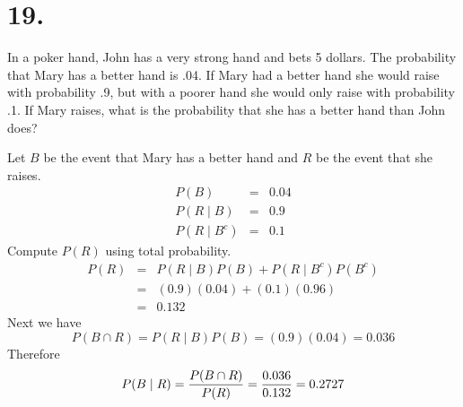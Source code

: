 \section*{19.}
In a poker hand, John has a very strong hand and bets 5 dollars. The probability
that Mary has a better hand is .04. If Mary had a better hand she
would raise with probability .9, but with a poorer hand she would only raise
with probability .1. If Mary raises, what is the probability that she has a
better hand than John does?

\bigskip
\noindent
Let $B$ be the event that Mary has a better hand and $R$ be the event that she
raises.
\begin{eqnarray*}
P(B)&=&0.04\\
P(R\mid B)&=&0.9\\
P(R\mid B^c)&=&0.1
\end{eqnarray*}
Compute $P(R)$ using total probability.
\begin{eqnarray*}
P(R)&=&P(R\mid B)P(B)+P(R\mid B^c)P(B^c)\\
&=&(0.9)(0.04)+(0.1)(0.96)\\
&=&0.132
\end{eqnarray*}
Next we have
$$P(B\cap R)=P(R\mid B)P(B)=(0.9)(0.04)=0.036$$
Therefore
$$P(B\mid R)={P(B\cap R)\over P(R)}={0.036\over0.132}=0.2727$$



